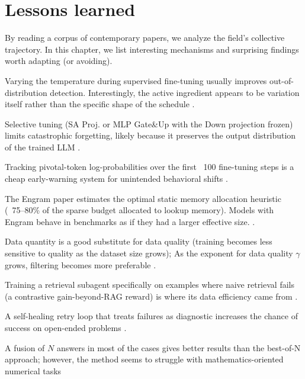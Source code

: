 \section{Lessons learned}
\label{section:lessons}

\begin{summarybox}
    By reading a corpus of contemporary papers, we analyze the field's collective trajectory. In this chapter, we list interesting mechanisms and surprising findings worth adapting (or avoiding).
\end{summarybox}

Varying the temperature during supervised fine-tuning usually improves out-of-distribution detection. Interestingly, the active ingredient appears to be variation itself rather than the specific shape of the schedule \cite{2505.18137}.

Selective tuning (SA Proj. or MLP Gate\&Up with the Down projection frozen) limits catastrophic forgetting, likely because it preserves the output distribution of the trained LLM \cite{2510.08564}. %

Tracking pivotal-token log-probabilities over the first ~100 fine-tuning steps is a cheap early-warning system for unintended behavioral shifts \cite{Betley2026}.

The Engram paper estimates the optimal static memory allocation heuristic (~75–80\% of the sparse budget allocated to lookup memory). Models with Engram behave in benchmarks as if they had a larger effective size. \cite{2601.07372}.

Data quantity is a good substitute for data quality (training becomes less sensitive to quality as the dataset size grows); 
As the exponent for data quality $\gamma$ grows, filtering becomes more preferable \cite{2510.03313}.

Training a retrieval subagent specifically on examples where naive retrieval fails (a contrastive gain-beyond-RAG reward) is where its data efficiency came from \cite{2512.16301}.

A self-healing retry loop that treats failures as diagnostic increases the chance of success on open-ended problems \cite{2605.20025, 2605.28655}.

A fusion of $N$ answers in most of the cases gives better results than the best-of-N approach; however, the method seems to struggle with mathematics-oriented numerical tasks \cite{2510.00931}

